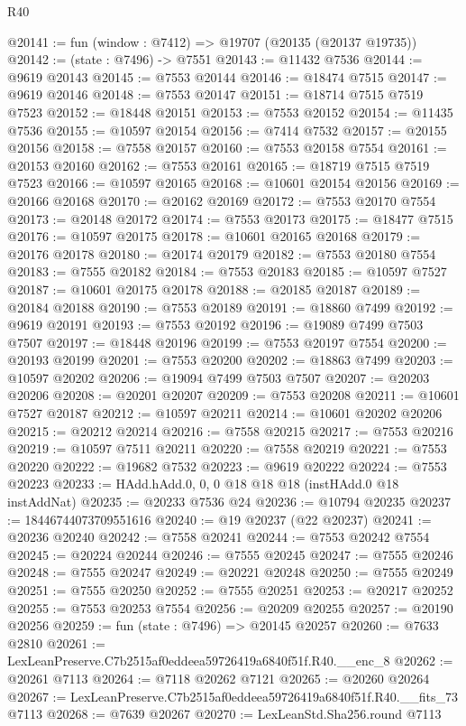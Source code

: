 \begin{lexlean}{R40}
\begin{coremodule}
@20141 := fun (window : @7412) => @19707 (@20135 (@20137 @19735))
@20142 := (state : @7496) -> @7551
@20143 := @11432 @7536
@20144 := @9619 @20143
@20145 := @7553 @20144
@20146 := @18474 @7515
@20147 := @9619 @20146
@20148 := @7553 @20147
@20151 := @18714 @7515 @7519 @7523
@20152 := @18448 @20151
@20153 := @7553 @20152
@20154 := @11435 @7536
@20155 := @10597 @20154
@20156 := @7414 @7532
@20157 := @20155 @20156
@20158 := @7558 @20157
@20160 := @7553 @20158 @7554
@20161 := @20153 @20160
@20162 := @7553 @20161
@20165 := @18719 @7515 @7519 @7523
@20166 := @10597 @20165
@20168 := @10601 @20154 @20156
@20169 := @20166 @20168
@20170 := @20162 @20169
@20172 := @7553 @20170 @7554
@20173 := @20148 @20172
@20174 := @7553 @20173
@20175 := @18477 @7515
@20176 := @10597 @20175
@20178 := @10601 @20165 @20168
@20179 := @20176 @20178
@20180 := @20174 @20179
@20182 := @7553 @20180 @7554
@20183 := @7555 @20182
@20184 := @7553 @20183
@20185 := @10597 @7527
@20187 := @10601 @20175 @20178
@20188 := @20185 @20187
@20189 := @20184 @20188
@20190 := @7553 @20189
@20191 := @18860 @7499
@20192 := @9619 @20191
@20193 := @7553 @20192
@20196 := @19089 @7499 @7503 @7507
@20197 := @18448 @20196
@20199 := @7553 @20197 @7554
@20200 := @20193 @20199
@20201 := @7553 @20200
@20202 := @18863 @7499
@20203 := @10597 @20202
@20206 := @19094 @7499 @7503 @7507
@20207 := @20203 @20206
@20208 := @20201 @20207
@20209 := @7553 @20208
@20211 := @10601 @7527 @20187
@20212 := @10597 @20211
@20214 := @10601 @20202 @20206
@20215 := @20212 @20214
@20216 := @7558 @20215
@20217 := @7553 @20216
@20219 := @10597 @7511 @20211
@20220 := @7558 @20219
@20221 := @7553 @20220
@20222 := @19682 @7532
@20223 := @9619 @20222
@20224 := @7553 @20223
@20233 := HAdd.hAdd.{0, 0, 0} @18 @18 @18 (instHAdd.{0} @18 instAddNat)
@20235 := @20233 @7536 @24
@20236 := @10794 @20235
@20237 := 18446744073709551616
@20240 := @19 @20237 (@22 @20237)
@20241 := @20236 @20240
@20242 := @7558 @20241
@20244 := @7553 @20242 @7554
@20245 := @20224 @20244
@20246 := @7555 @20245
@20247 := @7555 @20246
@20248 := @7555 @20247
@20249 := @20221 @20248
@20250 := @7555 @20249
@20251 := @7555 @20250
@20252 := @7555 @20251
@20253 := @20217 @20252
@20255 := @7553 @20253 @7554
@20256 := @20209 @20255
@20257 := @20190 @20256
@20259 := fun (state : @7496) => @20145 @20257
@20260 := @7633 @2810
@20261 := LexLeanPreserve.C7b2515af0eddeea59726419a6840f51f.R40.__enc_8
@20262 := @20261 @7113
@20264 := @7118 @20262 @7121
@20265 := @20260 @20264
@20267 := LexLeanPreserve.C7b2515af0eddeea59726419a6840f51f.R40.__fits_73 @7113
@20268 := @7639 @20267
@20270 := LexLeanStd.Sha256.round @7113

\end{coremodule}
\end{lexlean}
